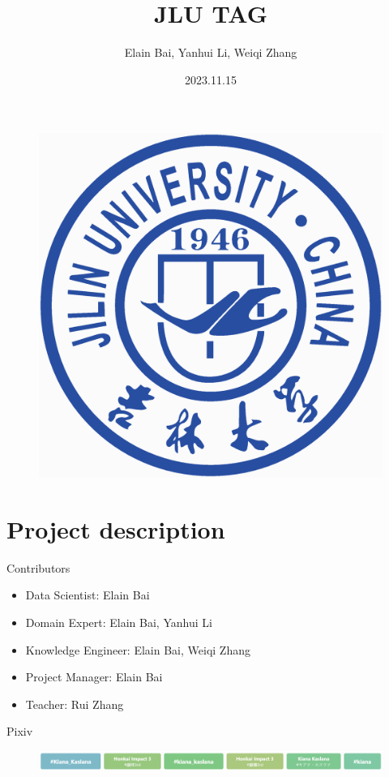 \documentclass{beamer}
\author{Elain Bai, Yanhui Li, Weiqi Zhang}
\title{JLU TAG}
\subtitle{}
\institute{Jilin University}
\date{2023.11.15}
\begin{document}
\kaishu
\begin{frame}
    \titlepage
    \begin{figure}[htpb]
        \begin{center}
            \includegraphics[width=0.15\linewidth]{pic/Jilin_University_Logo.eps}
        \end{center}
    \end{figure}
\end{frame}

\begin{frame}
\tableofcontents[sectionstyle=show,subsectionstyle=show/shaded/hide,subsubsectionstyle=show/shaded/hide]
\end{frame}

\section{Project description}

\begin{frame}{Contributors}
    \begin{itemize}
        \item Data Scientist: Elain Bai
        \item Domain Expert: Elain Bai, Yanhui Li
        \item Knowledge Engineer: Elain Bai, Weiqi Zhang
        \item Project Manager: Elain Bai
        \item Teacher: Rui Zhang
    \end{itemize}
\end{frame}

\begin{frame}{Pixiv}
    \begin{figure}[l]
        \centering
        \includegraphics[height=.08\textheight]{pic/pixiv.png}
    \end{figure}
\end{frame}
\end{document}
